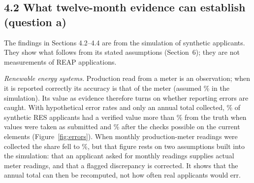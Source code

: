 \documentclass[11pt]{article}
\begin{document}
\subsection*{4.2 What twelve-month evidence can establish (question a)}

The findings in Sections 4.2--4.4 are from the simulation of synthetic applicants. They
show what follows from its stated assumptions (Section~6); they are not measurements of
REAP applications.

\emph{Renewable energy systems.} Production read from a meter is an observation; when it
is reported correctly its accuracy is that of the meter (assumed \CfgMeterError\% in the
simulation). Its value as evidence therefore turns on whether reporting errors are
caught. With hypothetical error rates and only an annual total collected,
\AccCurrentUnvalidatedResShareTen\% of synthetic RES applicants had a verified value more
than \ErrorShareThreshold\% from the truth when values were taken as submitted and
\AccCurrentValidatedResShareTen\% after the checks possible on the current elements
(Figure~\ref{fig:errors}). When monthly production-meter readings were collected the
share fell to \AccProductionMeterValidatedResShareTen\%, but that figure rests on two
assumptions built into the simulation: that an applicant asked for monthly readings
supplies actual meter readings, and that a flagged discrepancy is corrected. It shows that
the annual total can then be recomputed, not how often real applicants would err.
\end{document}

